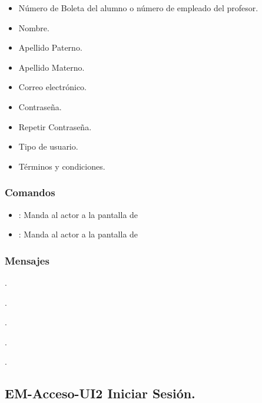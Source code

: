 	\begin{itemize}
		\item Número de Boleta del alumno o número de empleado del profesor.
	    \item Nombre. 	
	    \item Apellido Paterno.
	    \item Apellido Materno.
		\item Correo electrónico.
		\item Contraseña.
		\item Repetir Contraseña.
		\item Tipo de usuario.
		\item Términos y condiciones. 
	\end{itemize}

\subsubsection{Comandos}
	
	\begin{itemize}
		\item {}: Manda al actor a la pantalla de 
		\item {}: Manda al actor a la pantalla de 
	\end{itemize}

\subsubsection{Mensajes}
	
	\begin{Citemize}
		\item {}.
		\item {}.	
	    \item {}.
	    \item {}.
	    \item {}.
	\end{Citemize}



\subsection{EM-Acceso-UI2 Iniciar Sesión.}

